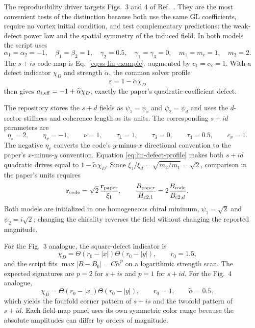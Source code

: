 \documentclass[11pt]{article}
\begin{document}
The reproducibility driver
 targets
Figs.~3 and 4 of Ref.~\cite{Lin2016}.  They are the most convenient tests of
the distinction because both use the same GL coefficients, require no vortex
initial condition, and test complementary predictions: the weak-defect power
law and the spatial symmetry of the induced field.  In both models the script
uses
\begin{equation}
 \alpha_1=\alpha_2=-1,\quad \beta_1=\beta_2=1,\quad
 \gamma_2=0.5,\quad \gamma_1=\gamma_3=0,\quad
 m_1=m_c=1,\quad m_2=2.
 \label{eq:lin-common-parameters}
\end{equation}
The $s+is$ code map is Eq.~\eqref{eq:ss-lin-example}, augmented by
$c_1=c_2=1$.  With a defect indicator $\chi_D$ and strength
$\widetilde\alpha$, the common solver profile
\begin{equation}
 \varepsilon=1-\widetilde\alpha\chi_D
 \label{eq:lin-defect-profile}
\end{equation}
then gives $a_{i,{\rm eff}}=-1+\widetilde\alpha\chi_D$, exactly the
paper's quadratic-coefficient defect.

The repository stores the $s+d$ fields as $\psi_1=\psi_s$ and
$\psi_2=\psi_d$ and uses the $d$-sector stiffness and coherence length as its
units.  The corresponding $s+id$ parameters are
\begin{equation}
 \eta_s=2,\qquad \eta_v=-1,\qquad \nu=1,\qquad
 \tau_1=1,\qquad \tau_3=0,\qquad \tau_4=0.5,\qquad c_\nu=1.
 \label{eq:lin-sid-map}
\end{equation}
The negative $\eta_v$ converts the code's $y$-minus-$x$ directional
convention to the paper's $x$-minus-$y$ convention.  Equation
\eqref{eq:lin-defect-profile} makes both $s+id$ quadratic drives equal to
$1-\widetilde\alpha\chi_D$.  Since
$\xi_1/\xi_d=\sqrt{m_2/m_1}=\sqrt2$, comparison in the paper's units requires
\begin{equation}
 \mathbf r_{\rm code}=\sqrt2\,\frac{\mathbf r_{\rm paper}}{\xi_1},
 \qquad
 \frac{B_{\rm paper}}{H_{c2,1}}=2\frac{B_{\rm code}}{B_{c2,d}}.
 \label{eq:lin-sid-unit-map}
\end{equation}
Both models are initialized in one homogeneous chiral minimum,
$\psi_1=\sqrt2$ and $\psi_2=i\sqrt2$; changing the chirality reverses the
field without changing the reported magnitude.

For the Fig.~3 analogue, the square-defect indicator is
\begin{equation}
 \chi_D=\Theta(r_0-|x|)\Theta(r_0-|y|),
 \qquad r_0=1.5,
\end{equation}
and the script fits $\max|B-B_0|=C\widetilde\alpha^p$ on a logarithmic
strength scan.  The expected signatures are $p=2$ for $s+is$ and $p=1$ for
$s+id$.  For the Fig.~4 analogue,
\begin{equation}
 \chi_D=\Theta(r_0-|x|)\Theta(r_0-|y|),\qquad
 r_0=1,\qquad \widetilde\alpha=0.5,
\end{equation}
which yields the fourfold corner pattern of $s+is$ and the twofold pattern of
$s+id$.  Each field-map panel uses its own symmetric color range because the
absolute amplitudes can differ by orders of magnitude.
\end{document}
